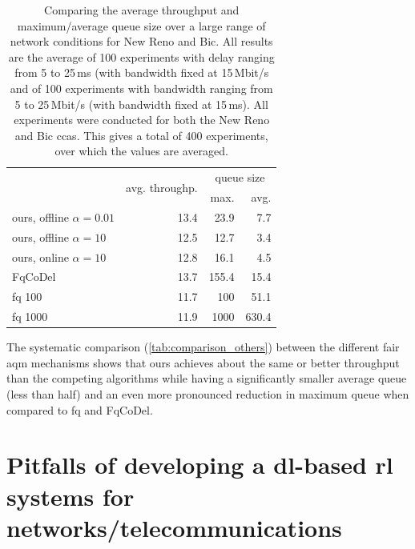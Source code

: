 \documentclass[conference]{IEEEtran}
\begin{document}
\begin{table}
\caption{Comparing the average throughput and maximum/average queue size over a large range of network conditions for New Reno and Bic. All results are the average of 100 experiments with delay ranging from 5 to 25\,ms (with bandwidth fixed at 15\,Mbit/s and of 100 experiments with bandwidth ranging from 5 to 25\,Mbit/s (with bandwidth fixed at 15\,ms). All experiments were conducted for both the New Reno and Bic \glspl{cca}. This gives a total of 400 experiments, over which the values are averaged.} \label{tab:comparison_others}
\centering
\begin{tabular}{l r r r} \toprule
& \multirow{2}{*}{avg. throughp.} & \multicolumn{2}{c}{queue size} \\
& & max. & avg. \\ \midrule
\gls{ours}, offline $\alpha=0.01$ & 13.4 & 23.9 & 7.7\\
\gls{ours}, offline $\alpha=10$ & 12.5 & 12.7 & 3.4\\
\gls{ours}, online $\alpha=10$ & 12.8 & 16.1 & 4.5\\
FqCoDel	& 13.7 & 155.4 & 15.4\\
fq 100	& 11.7 & 100 & 51.1\\
fq 1000	& 11.9 & 1000 & 630.4 \\
\bottomrule
\end{tabular}
\end{table}

The systematic comparison (\autoref{tab:comparison_others}) between the different fair \gls{aqm} mechanisms shows that \gls{ours} achieves about the same or better throughput than the competing algorithms while having a significantly smaller average queue (less than half) and an even more pronounced reduction in maximum queue when compared to fq and FqCoDel.  

\section{Pitfalls of developing a \gls{dl}-based \gls{rl} systems for networks/telecommunications}
\end{document}
